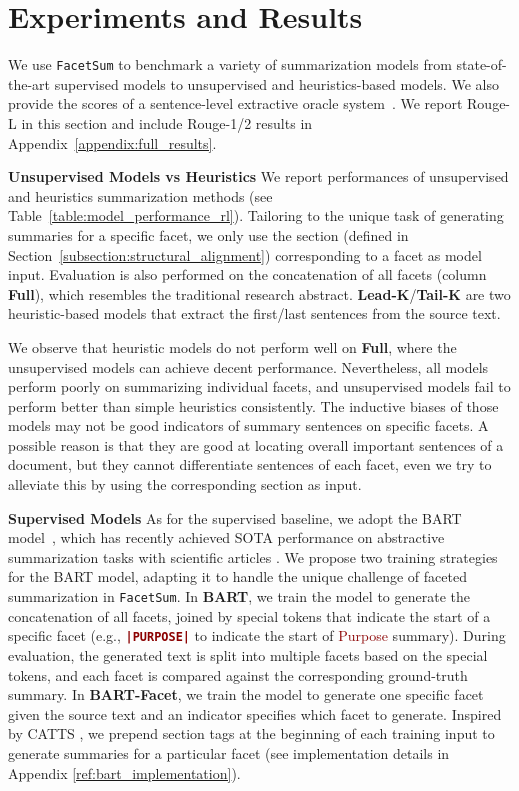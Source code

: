 \documentclass[11pt,a4paper]{article}
\newcommand{\ours}{\texttt{FacetSum}\xspace}
\newcommand{\absp}{\textcolor{darkred}{Purpose}\xspace}
\newcommand{\bart}{BART\xspace}
\newcommand{\bartf}{BART-Facet\xspace}
\newcommand{\code}[1]{\texttt{#1}}
\newcommand{\cmd}[1]{\textcolor{darkred}{\textbf{\small{\code{#1}}}}}
\begin{document}
\section{Experiments and Results}
\label{section:exp}
We use \ours to benchmark a variety of summarization models from state-of-the-art supervised models to unsupervised and heuristics-based models.
We also provide the scores of a sentence-level extractive oracle system~\cite{nallapati2017summarunner}. We report Rouge-L in this section and include Rouge-1/2 results in Appendix~\ref{appendix:full_results}.

\noindent\textbf{Unsupervised Models vs Heuristics}\quad
We report performances of unsupervised and heuristics summarization methods  (see Table~\ref{table:model_performance_rl}). 
Tailoring to the unique task of generating summaries for a specific facet, we only use the section (defined in Section~\ref{subsection:structural_alignment}) corresponding to a facet as model input.
Evaluation is also performed on the concatenation of all facets (column \textbf{Full}), which resembles the traditional research abstract.
\textbf{Lead-K}/\textbf{Tail-K} are two heuristic-based models that extract the first/last  sentences from the source text.



We observe that heuristic models do not perform well on \textbf{Full}, where the unsupervised models can achieve decent performance.
Nevertheless, all models perform poorly on summarizing individual facets, and unsupervised models fail to perform better than simple heuristics consistently.
The inductive biases of those models may not be good indicators of summary sentences on specific facets. A possible reason is that they are good at locating overall important sentences of a document, but they cannot differentiate sentences of each facet, even we try to alleviate this by using the corresponding section as input. 






\noindent\textbf{Supervised Models}\quad
As for the supervised baseline, we adopt the \bart model~\citep{lewis2020bart}, which has recently achieved SOTA performance on abstractive summarization tasks with scientific articles \citep{cachola2020tldr}.
We propose two training strategies for the \bart model, adapting it to handle the unique challenge of faceted summarization in \ours.
In \textbf{\bart}, we train the model to generate the concatenation of all facets, joined by special tokens that indicate the start of a specific facet (e.g., \cmd{|PURPOSE|} to indicate the start of \absp summary). 
During evaluation, the generated text is split into multiple facets based on the special tokens, and each facet is compared against the corresponding ground-truth summary.
In \textbf{\bartf}, we train the model to generate one specific facet given the source text and an indicator specifies which facet to generate.
Inspired by CATTS \citep{cachola2020tldr}, we prepend section tags at the beginning of each training input to generate summaries for a particular facet (see implementation details in Appendix \ref{ref:bart_implementation}). 
\end{document}
